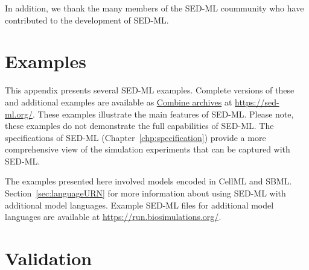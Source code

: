 \documentclass[pdftex,rgb,dvipsnames,svgnames,hyperref,table]{report}
\begin{document}
In addition, we thank the many members of the SED-ML coummunity who have contributed to the development of SED-ML.

\appendix

\chapter{Examples}
\label{app:examples}
This appendix presents several SED-ML examples. Complete versions of these and additional examples are available as \hyperref[sec:archive]{Combine archives} at \url{https://sed-ml.org/}. These examples illustrate the main features of SED-ML. Please note, these examples do not demonstrate the full capabilities of SED-ML. The specifications of SED-ML (Chapter~\ref{chp:specification}) provide a more comprehensive view of the simulation experiments that can be captured with SED-ML. 

The examples presented here involved models encoded in CellML and SBML.  Section~\ref{sec:languageURN} for more information about using SED-ML with additional model languages. Example SED-ML files for additional model languages are available at \url{https://run.biosimulations.org/}.



\chapter{Validation}
\label{app:validation}
\begin{blockChanged}

\end{blockChanged}

%






\end{document}
